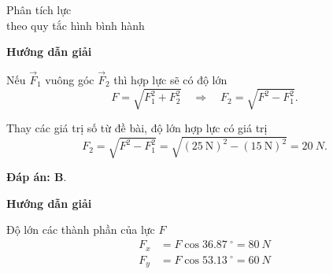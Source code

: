 \begin{dang}{Phân tích lực\\ theo quy tắc hình bình hành}
	{	\begin{center}
			\textbf{Hướng dẫn giải}
		\end{center}
		
		Nếu $\vec{F}_1$ vuông góc $\vec{F}_2$ thì hợp lực sẽ có độ lớn 
				$$F=\sqrt{F_1^2+F_2^2} \quad\Rightarrow\quad F_2=\sqrt{F^2-F_1^2}.$$
		
		Thay các giá trị số từ đề bài, độ lớn hợp lực có giá trị 		
		$$F_2 = \sqrt {F^2 - F_1^2} =\sqrt{(\SI{25}{\newton})^2-(\SI{15}{\newton})^2}= \SI{20}{N}.$$
		
		\textbf{Đáp án: B}.
	}
	{	\begin{center}
			\textbf{Hướng dẫn giải}
		\end{center}
		
		
		
		Độ lớn các thành phần của lực $F$
		\begin{align*}
			F_{x} &= F\cos \SI{36,87}{^\circ} = \SI{80}{N}\\
			F_{y}&= F\cos \SI{53,13}{^\circ} = \SI{60}{N}
		\end{align*}
	}
\end{dang}
